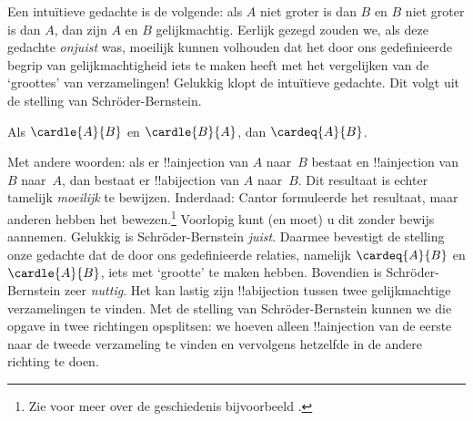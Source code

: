 \documentclass[openany]{memoir}
\begin{document}
\begingroup
\def\olfilename{OLP-0037}
\def\olfilepath{content/sets-functions-relations/size-of-sets/}
\hypertarget{unit-OLP-0037}{}



\begin{explain}
Een intuïtieve gedachte is de volgende: als $A$ niet groter is dan $B$
en $B$ niet groter is dan $A$, dan zijn $A$ en $B$ gelijkmachtig.
Eerlijk gezegd zouden we, als deze gedachte \emph{onjuist} was,
moeilijk kunnen volhouden dat het door ons gedefinieerde begrip van
gelijkmachtigheid iets te maken heeft met het vergelijken van de
‘groottes’ van verzamelingen!{} Gelukkig klopt de intuïtieve gedachte.
Dit volgt uit de stelling van Schr\"oder-Bernstein.
\end{explain}
\begin{thm}
	Als $\cardle{A}{B}$ en $\cardle{B}{A}$,
	dan $\cardeq{A}{B}$.
\end{thm}
\begin{explain}
Met andere woorden: als er !!a{injection} van $A$ naar~$B$ bestaat en
!!a{injection} van $B$ naar~$A$, dan bestaat er !!a{bijection} van $A$
naar~$B$.
Dit resultaat is echter tamelijk \emph{moeilijk} te bewijzen. Inderdaad:
Cantor formuleerde het resultaat, maar anderen hebben het
bewezen.\footnote{Zie voor meer over de geschiedenis bijvoorbeeld
\citet[pp.~165--6]{Potter2004}.}
%
Voorlopig kunt (en moet) u dit zonder bewijs aannemen.
Gelukkig is Schr\"oder-Bernstein \emph{juist}. Daarmee bevestigt de
stelling onze gedachte dat de door ons gedefinieerde relaties, namelijk
$\cardeq{A}{B}$ en $\cardle{A}{B}$, iets met ‘grootte’ te maken hebben.
Bovendien is Schr\"oder-Bernstein zeer \emph{nuttig}. Het kan lastig
zijn !!a{bijection} tussen twee gelijkmachtige verzamelingen te
vinden. Met de stelling van Schr\"oder-Bernstein kunnen we die opgave in
twee richtingen opsplitsen: we hoeven alleen !!a{injection} van de eerste
naar de tweede verzameling te vinden en vervolgens hetzelfde in de
andere richting te doen.
\end{explain}
\endgroup
\end{document}

